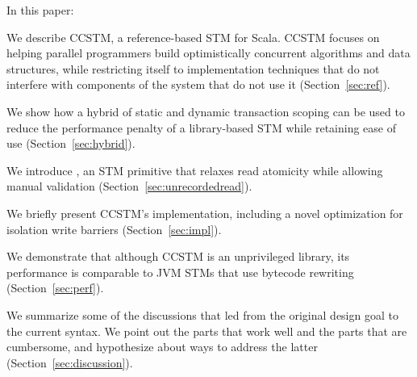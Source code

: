 In this paper:
\begin{packed_enum}
\setlength{\itemsep}{5pt}

\item We describe CCSTM, a reference-based STM for Scala.  CCSTM focuses
on helping parallel programmers build optimistically concurrent algorithms
and data structures, while restricting itself to implementation techniques
that do not interfere with components of the system that do not use it
(Section~\ref{sec:ref}).

\item We show how a hybrid of static and dynamic transaction scoping can
be used to reduce the performance penalty of a library-based STM while
retaining ease of use (Section~\ref{sec:hybrid}).

\item We introduce , an STM primitive that relaxes
read atomicity while allowing manual validation
(Section~\ref{sec:unrecordedread}).


\item We briefly present CCSTM's implementation, including a
novel optimization for isolation write barriers
(Section~\ref{sec:impl}).

\item We demonstrate that although CCSTM is an unprivileged library,
its performance is comparable to JVM STMs that use bytecode rewriting
(Section~\ref{sec:perf}).

\item We summarize some of the discussions that led from the original
design goal to the current syntax.  We point out the parts that work
well and the parts that are cumbersome, and hypothesize about ways to
address the latter (Section~\ref{sec:discussion}).

\end{packed_enum}

